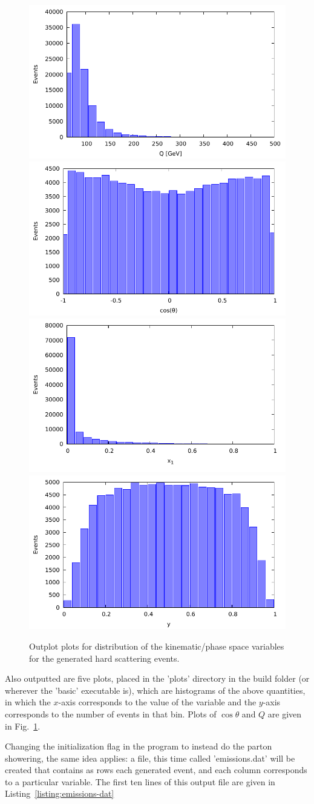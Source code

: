 \begin{figure}[ht]
  \centering
  \includegraphics[width=0.4\linewidth]{./res/Images/Q.pdf}
  \includegraphics[width=0.4\linewidth]{./res/Images/cos_theta.pdf}
  \includegraphics[width=0.4\linewidth]{./res/Images/x1.pdf}
  \includegraphics[width=0.4\linewidth]{./res/Images/y.pdf}
  \caption{Outplot plots for distribution of the kinematic/phase space variables for the generated hard scattering events.}
  \label{fig:q-dist}
\end{figure}

Also outputted are five plots, placed in the 'plots' directory in the build folder (or wherever the 'basic' executable is), which are histograms of the above quantities, in which the $x$-axis corresponds to the value of the variable and the $y$-axis corresponds to the number of events in that bin. Plots of $\cos\theta$ and $Q$ are given in Fig.~\ref{fig:q-dist}.

Changing the initialization flag in the program to instead do the parton showering, the same idea applies: a file, this time called 'emissions.dat' will be created that contains as rows each generated event, and each column corresponds to a particular variable. The first ten lines of this output file are given in Listing~\ref{listing:emissions-dat}

